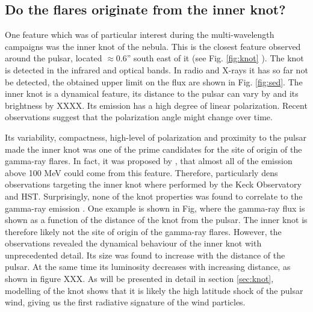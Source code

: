 \subsection{Do the flares originate from the inner knot?}
One feature which was of particular interest during the multi-wavelength campaigns was the inner knot of the nebula. This is the closest feature observed around the pulsar, located $\approx$0.6'' south east of it (see Fig. \ref{fig:knot} ). The knot is detected in the infrared and optical bands. In radio and X-rays it has so far not be detected, the obtained upper limit on the flux are shown in Fig. \ref{fig:sed}. The inner knot is a dynamical feature, its distance to the pulsar can vary by and its brightness by XXXX. Its emission has a high degree of linear polarization. Recent observations suggest that the polarization angle might change over time.  

Its variability, compactness, high-level of polarization and  proximity to the pulsar made the inner knot was one of the prime candidates for the site of origin of the gamma-ray flares.
In fact, it was proposed by , that almost all of the emission above 100 MeV could come from this feature. Therefore, particularly dens observations targeting the inner knot where performed by the Keck Observatory and HST. Surprisingly, none of the knot properties was found to correlate to the gamma-ray emission \cite{rudy2015}. One example is shown in Fig, where the gamma-ray flux is shown as a function of the distance of the knot from the pulsar. The inner knot is therefore likely not the site of origin of the gamma-ray flares. However, the observations revealed the dynamical behaviour of the inner knot with unprecedented detail. Its size was found to increase with the distance of the pulsar. At the same time its luminosity decreases with increasing distance, as shown in figure XXX.  As will be presented in detail in section \ref{sec:knot}, modelling of the knot shows that it is likely the high latitude shock of the pulsar wind, giving us the first radiative signature of the wind particles.